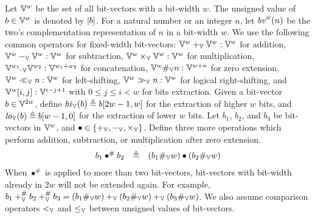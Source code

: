 Let $\mathbb{V}^w$ be the set of all bit-vectors with a bit-width $w$.
The unsigned value of $b \in \mathbb{V}^w$ is denoted by $|b|$.
For a natural number or an integer $n$, let $\mathit{bv}^w(n)$ be the two's complementation representation of $n$ in a bit-width $w$.
We use the following common operators for fixed-width bit-vectors: $\mathbb{V}^w +_{\mathbb{V}} \mathbb{V}^w : \mathbb{V}^w$ for addition, $\mathbb{V}^w -_{\mathbb{V}} \mathbb{V}^w : \mathbb{V}^w$ for subtraction, $\mathbb{V}^w \times_{\mathbb{V}} \mathbb{V}^w : \mathbb{V}^w$ for multiplication, $\mathbb{V}^{w_1} ._{\mathbb{V}} \mathbb{V}^{w_2} : \mathbb{V}^{w_1 + w_2}$ for concatenation, $\mathbb{V}^w \#_{\mathbb{V}} n : \mathbb{V}^{w+n}$ for zero extension, $\mathbb{V}^w \ll_{\mathbb{V}} n : \mathbb{V}^w$ for left-shifting, $\mathbb{V}^w \gg_{\mathbb{V}} n : \mathbb{V}^w$ for logical right-shifting, and $\mathbb{V}^w[i,j] : \mathbb{V}^{i - j + 1}$ with $0 \leq j \leq i < w$ for bits extraction.
Given a bit-vector $b \in \mathbb{V}^{2w}$, define $\mathit{hi}_{\mathbb{V}}(b) \triangleq b[2w - 1, w]$ for the extraction of higher $w$ bits, and $\mathit{lo}_{\mathbb{V}}(b) \triangleq b[w - 1, 0]$ for the extraction of lower $w$ bits.
Let $b_1$, $b_2$, and $b_3$ be bit-vectors in $\mathbb{V}^{w}$, and $\bullet \in \{+_{\mathbb{V}}, -_{\mathbb{V}}, \times_{\mathbb{V}}\}$.
Define three more operations which perform addition, subtraction, or multiplication after zero extension.
\[
\begin{array}{rcl}
b_1 \bullet^{\#} b_2 & \triangleq & (b_1 \#_{\mathbb{V}} w) \bullet (b_2 \#_{\mathbb{V}} w) \\
\end{array}
\]
When $\bullet^{\#}$ is applied to more than two bit-vectors, bit-vectors with bit-width already in $2w$ will not be extended again.
For example, $b_1 +_{\mathbb{V}}^{\#} b_2 +_{\mathbb{V}}^{\#} b_3 = (b_1 \#_{\mathbb{V}} w) +_{\mathbb{V}} (b_2 \#_{\mathbb{V}} w) +_{\mathbb{V}} (b_3 \#_{\mathbb{V}} w)$.
We also assume comparison operators $<_{\mathbb{V}}$ and $\leq_{\mathbb{V}}$ between unsigned values of bit-vectors.


